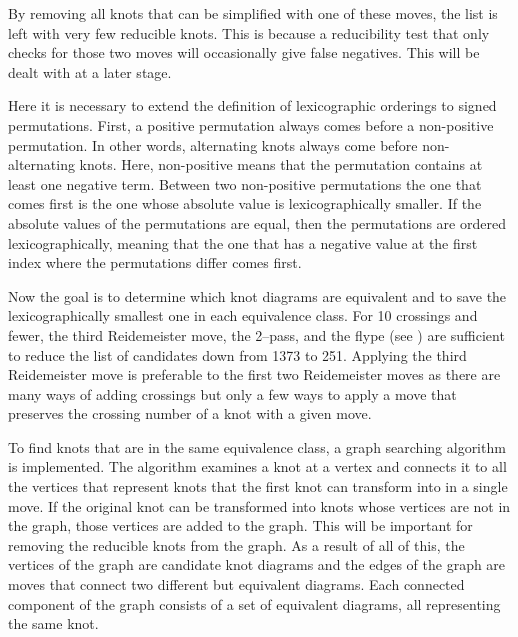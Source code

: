 \begin{paper}

By removing all knots that can be simplified with one of these moves, the list
is left with very few reducible knots.
This is because a reducibility test that only checks for those two moves will
occasionally give false negatives.
This will be dealt with at a later stage.



Here it is necessary to extend the definition of lexicographic orderings to
signed permutations.
First, a positive permutation always comes before a non-positive permutation.
In other words, alternating knots always come before non-alternating knots.
Here, non-positive means that the permutation contains at least one negative
term.
Between two non-positive permutations the one that comes first is the one whose
absolute value is lexicographically smaller.
If the absolute values of the permutations are equal, then the permutations are
ordered lexicographically, meaning that the one that has a negative value at the
first index where the permutations differ comes first.


Now the goal is to determine which knot diagrams are equivalent and to save the
lexicographically smallest one in each equivalence class.
For 10 crossings and fewer, the third Reidemeister move, the 2--pass, and the
flype (see \figMoves) are sufficient to reduce the list of candidates down
from 1373 to 251.
Applying the third Reidemeister move is preferable to the first two
Reidemeister moves as there are many ways of adding crossings but only a few
ways to apply a move that preserves the crossing number of a knot with a given
move.


To find knots that are in the same equivalence class, a graph searching
algorithm is implemented.
The algorithm examines a knot at a vertex and connects it to all the vertices
that represent knots that the first knot can transform into in a single move.
If the original knot can be transformed into knots whose vertices are not in the
graph, those vertices are added to the graph.
This will be important for removing the reducible knots from the graph.
As a result of all of this, the vertices of the graph are candidate knot
diagrams and the edges of the graph are moves that connect two different but
equivalent diagrams.
Each connected component of the graph consists of a set of equivalent diagrams,
all representing the same knot.


\end{paper}
